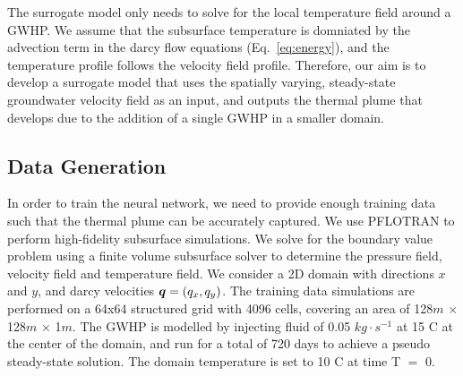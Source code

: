 \documentclass{article} %
\begin{document}
The surrogate model only needs to solve for the local temperature field around a GWHP. 
We assume that the subsurface temperature is domniated by the advection term in the darcy flow equations (Eq.~\ref{eq:energy}), and the temperature profile follows the velocity field profile. 
Therefore, our aim is to develop a surrogate model that uses the spatially varying, steady-state groundwater velocity field as an input, and outputs the thermal plume that develops due to the addition of a single GWHP in a smaller domain. 


\subsection*{Data Generation}


In order to train the neural network, we need to provide enough training data such that the thermal plume can be accurately captured. We use PFLOTRAN \citep{pflotran-paper} to perform high-fidelity subsurface simulations.
We solve for the boundary value problem using a finite volume subsurface solver to determine the pressure field, velocity field and temperature field.
We consider a 2D domain with directions $x$ and $y$, and darcy velocities ${\bm{q}} = (q_x, q_y)$.
The training data simulations are performed on a 64x64 structured grid with 4096 cells, covering an area of 128$m$ $\times$ 128$m$ $\times$ 1$m$. The GWHP is modelled by injecting fluid of 0.05 $kg \cdot s^{-1}$ at 15 \degree C at the center of the domain, and run for a total of 720 days to achieve a pseudo steady-state solution. The domain temperature is set to 10 \degree C at time T $=$ 0.
\end{document}
